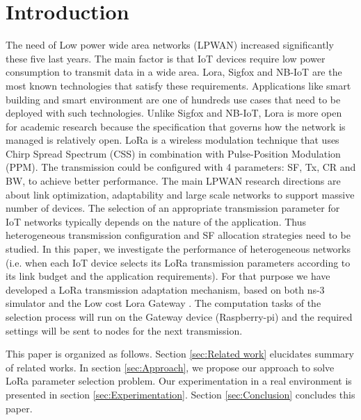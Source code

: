 \section{Introduction} \label{sec:Introduction}

The need of Low power wide area networks (LPWAN) increased significantly these five last years.
The main factor is that IoT devices require low power consumption to transmit data in a wide area.
Lora,
	Sigfox and NB-IoT are the most known technologies that satisfy these requirements.
Applications like smart building and smart environment are one of hundreds use cases that need to be deployed with such technologies.
Unlike Sigfox and NB-IoT,
	Lora is more open for academic research because the specification that governs how the network is managed is relatively open.
LoRa is a wireless modulation technique that uses Chirp Spread Spectrum (CSS) in combination with Pulse-Position Modulation (PPM).
The transmission could be configured with 4 parameters:
	\ac{SF},
	\ac{Tx},
	\ac{CR} and \ac{BW},
	to achieve better performance.
The main LPWAN research directions are about link optimization, adaptability and large scale networks to support massive number of devices.
The selection of an appropriate transmission parameter for IoT networks typically depends on the nature of the application.
Thus heterogeneous transmission configuration and \ac{SF} allocation strategies need to be studied.
In this paper,
	we investigate the performance of heterogeneous networks (i.e.
when each IoT device selects its LoRa transmission parameters according to its link budget and the application requirements).
For that purpose we have developed a LoRa transmission adaptation mechanism,
	based on both ns-3 simulator and the Low cost Lora Gateway \cite{lowcostloragateway}.
The computation tasks of the selection process will run on the Gateway device (Raspberry-pi) and the required settings will be sent to nodes for the next transmission.

This paper is organized as follows.
Section \ref{sec:Related work} elucidates summary of related works.
In section \ref{sec:Approach}, we propose our approach to solve LoRa parameter selection problem.
Our experimentation in a real environment is presented in section \ref{sec:Experimentation}.
Section \ref{sec:Conclusion} concludes this paper.


